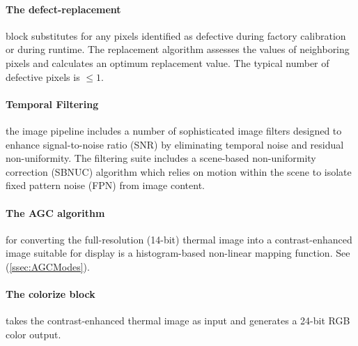 \paragraph{The defect-replacement} block substitutes for any pixels identified
as defective during factory calibration or during runtime. The replacement
algorithm assesses the values of neighboring pixels and calculates an optimum
replacement value. The typical number of defective pixels is $\leq 1$.
%
\paragraph{Temporal Filtering} the image pipeline includes a number of
sophisticated image filters designed to enhance signal-to-noise ratio (SNR) by
eliminating temporal noise and residual non-uniformity. The filtering suite
includes a scene-based non-uniformity correction (SBNUC) algorithm which relies
on motion within the scene to isolate fixed pattern noise (FPN) from image
content.
%
\paragraph{The AGC algorithm} for converting the full-resolution (14-bit)
thermal image into a contrast-enhanced image suitable for display is a
histogram-based non-linear mapping function. See (\ref{ssec:AGCModes}).
%
\paragraph{The colorize block} takes the contrast-enhanced thermal image as
input and generates a 24-bit RGB color output.
%
